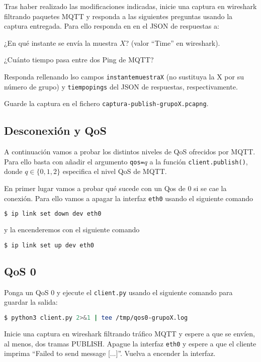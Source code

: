 \documentclass{upmassignment}
\begin{document}
Tras haber realizado las modificaciones
indicadas, inicie una captura en
wireshark filtrando paquetes MQTT y
responda a las siguientes
preguntas usando la captura entregada.
Para ello responda en
en el JSON de respuestas a:


\begin{problemlist}
    \pbitem ¿En qué instante
        se envía la muestra $X$?
        (valor ``Time'' en wireshark).

    \pbitem ¿Cuánto tiempo
        pasa entre dos 
        Ping de MQTT?
\end{problemlist}
Responda rellenando lso campos
\texttt{instantemuestraX} (no sustituya
la X por su número de grupo) y
\texttt{tiempopings} del JSON
de respuestas, respectivamente.

Guarde la captura en el fichero
\texttt{captura-publish-grupoX.pcapng}.


\subsection*{Desconexión y QoS}
\noindent A continuación vamos a probar
los distintos niveles de QoS ofrecidos
por MQTT. Para ello basta con
añadir el argumento
\texttt{qos=$q$} a la función
\texttt{client.publish()}, donde
$q\in\{0,1,2\}$ especifica el nivel
QoS de MQTT.

En primer lugar vamos a probar
qué sucede con un Qos de 0 si se
cae la conexión. Para ello vamos a
apagar la interfaz
\texttt{eth0} usando el
siguiente comando
\begin{lstlisting}[language=bash]
$ ip link set down dev eth0
\end{lstlisting}
y la encenderemos con el siguiente comando
\begin{lstlisting}[language=bash]
$ ip link set up dev eth0
\end{lstlisting}



\subsection*{QoS 0}
\noindent
Ponga un QoS 0 y ejecute el
\texttt{client.py} usando el
siguiente comando para guardar la salida:
\begin{lstlisting}[language=bash]
$ python3 client.py 2>&1 | tee /tmp/qos0-grupoX.log
\end{lstlisting}

Inicie una
captura en wireshark filtrando
tráfico MQTT y espere a que
se envíen, al menos, dos tramas
PUBLISH. Apague la interfaz
\texttt{eth0} y espere a que
el cliente imprima
``Failed to send message [...]''.
Vuelva a encender la interfaz.
\end{document}
